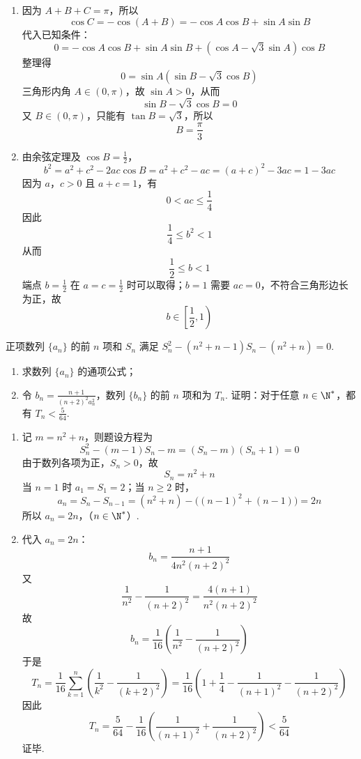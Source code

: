 \begin{solution}
\begin{enumerate}
\item 因为 \(A+B+C=\pi\)，所以
\[
\cos C=-\cos(A+B)=-\cos A\cos B+\sin A\sin B
\]
代入已知条件：
\[
0=-\cos A\cos B+\sin A\sin B
+(\cos A-\sqrt3\sin A)\cos B
\]
整理得
\[
0=\sin A(\sin B-\sqrt3\cos B)
\]
三角形内角 \(A\in(0,\pi)\)，故 \(\sin A>0\)，从而
\[
\sin B-\sqrt3\cos B=0
\]
又 \(B\in(0,\pi)\)，只能有 \(\tan B=\sqrt3\)，所以
\[
B=\frac{\pi}{3}
\]

\item 由余弦定理及 \(\cos B=\frac{1}{2}\)，
\[
b^2=a^2+c^2-2ac\cos B
=a^2+c^2-ac
=(a+c)^2-3ac
=1-3ac
\]
因为 \(a\)，\(c>0\) 且 \(a+c=1\)，有
\[
0<ac\leqslant\frac14
\]
因此
\[
\frac14\leqslant b^2<1
\]
从而
\[
\frac12\leqslant b<1
\]
端点 \(b=\frac{1}{2}\) 在 \(a=c=\frac{1}{2}\) 时可以取得；\(b=1\) 需要 \(ac=0\)，不符合三角形边长为正，故
\[
b\in\left[\frac12,1\right)
\]
\end{enumerate}
\end{solution}

\begin{problem}
正项数列 \(\{a_{n}\}\) 的前 \(n\) 项和 \(S_{n}\) 满足 \(S_{n}^{2} - (n^{2} + n - 1)S_{n} - (n^{2} + n) = 0\).

\begin{enumerate}
\item 求数列 \(\{a_{n}\}\) 的通项公式；
\item 令 \(b_{n} = \frac{n + 1}{(n + 2)^2 a_{n}^{2}}\)，数列 \(\{b_{n}\}\) 的前 \(n\) 项和为 \(T_{n}\). 证明：对于任意 \(n \in \N^{*}\)，都有 \(T_{n} < \frac{5}{64}\).
\end{enumerate}
\end{problem}

\begin{solution}
\begin{enumerate}
\item 记 \(m=n^2+n\)，则题设方程为
\[
S_n^2-(m-1)S_n-m=(S_n-m)(S_n+1)=0
\]
由于数列各项为正，\(S_n>0\)，故
\[
S_n=n^2+n
\]
当 \(n=1\) 时 \(a_1=S_1=2\)；当 \(n\geqslant2\) 时，
\[
a_n=S_n-S_{n-1}
=(n^2+n)-\bigl((n-1)^2+(n-1)\bigr)=2n
\]
所以
\(a_n=2n\)，（\(n\in\N^*\)）.

\item 代入 \(a_n=2n\)：
\[
b_n=\frac{n+1}{4n^2(n+2)^2}
\]
又
\[
\frac1{n^2}-\frac1{(n+2)^2}
=\frac{4(n+1)}{n^2(n+2)^2}
\]
故
\[
b_n=\frac1{16}\left(\frac1{n^2}-\frac1{(n+2)^2}\right)
\]
于是
\[
T_n=\frac1{16}\sum_{k=1}^n
\left(\frac1{k^2}-\frac1{(k+2)^2}\right)
=\frac1{16}\left(1+\frac14-\frac1{(n+1)^2}-\frac1{(n+2)^2}\right)
\]
因此
\[
T_n=\frac5{64}-\frac1{16}\left(\frac1{(n+1)^2}+\frac1{(n+2)^2}\right)
<\frac5{64}
\]
证毕.
\end{enumerate}
\end{solution}

